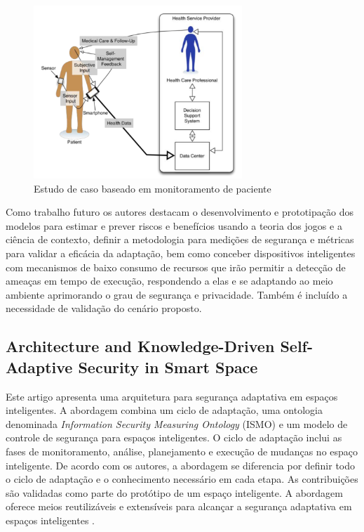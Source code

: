 \documentclass[tid,table]{texufpel} %
\begin{document}
\begin{figure}[ht]
\centering
\includegraphics[width=0.7\textwidth]{imagens/case-study-patient-monitoring.png}
\caption{Estudo de caso baseado em monitoramento de paciente}
\label{case-study-patient-monitoring}
\end{figure}


Como trabalho futuro os autores destacam o desenvolvimento e prototipação dos modelos para estimar e prever riscos e benefícios usando a teoria dos jogos e a ciência de contexto, definir a metodologia para medições de segurança e métricas para validar a eficácia da adaptação, bem como conceber dispositivos inteligentes com mecanismos de baixo consumo de recursos que irão permitir a detecção de ameaças em tempo de execução, respondendo a elas e se adaptando ao meio ambiente aprimorando o grau de segurança e privacidade. Também é incluído a necessidade de validação do cenário proposto.



\subsection{Architecture and Knowledge-Driven Self-Adaptive Security in Smart Space} %

Este artigo apresenta uma arquitetura para segurança adaptativa em espaços inteligentes. A abordagem combina um ciclo de adaptação, uma ontologia denominada \textit{Information Security Measuring Ontology} (ISMO) e um modelo de controle de segurança para espaços inteligentes. O ciclo de adaptação inclui as fases de monitoramento, análise, planejamento e execução de mudanças no espaço inteligente. De acordo com os autores, a abordagem se diferencia por definir todo o ciclo de adaptação e o conhecimento necessário em cada etapa. As contribuições são validadas como parte do protótipo de um espaço inteligente. A abordagem oferece meios reutilizáveis e extensíveis para alcançar a segurança adaptativa em espaços inteligentes \cite{evesti13c}. 
\end{document}
